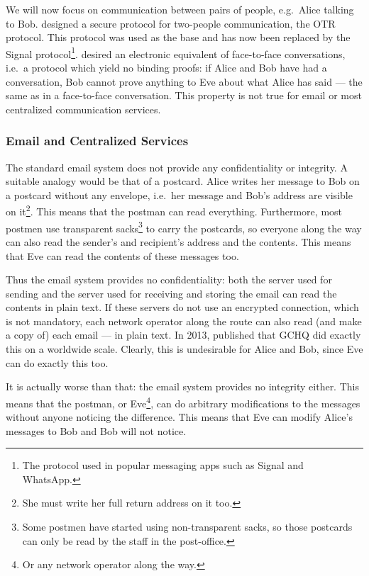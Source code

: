 We will now focus on communication between pairs of people, e.g.\ Alice talking 
to Bob.
\citeauthor{otr2004} designed a secure protocol for two-people communication, 
the \ac{OTR} protocol.
This protocol was used as the base and has now been replaced by the Signal 
protocol\footnote{%
  The protocol used in popular messaging apps such as Signal and WhatsApp.
}.
\citeauthor{otr2004} desired an electronic equivalent of face-to-face 
conversations, i.e.\ a protocol which yield no binding proofs:
if Alice and Bob have had a conversation, Bob cannot prove anything to Eve 
about what Alice has said --- the same as in a face-to-face conversation.
This property is not true for email or most centralized communication
services.

\subsubsection{Email and Centralized Services}

The standard email system does not provide any confidentiality or 
integrity.
A suitable analogy would be that of a postcard.
Alice writes her message to Bob on a postcard without any envelope, i.e.\ her 
message and Bob's address are visible on it\footnote{%
  She must write her full return address on it too.
}.
This means that the postman can read everything.
Furthermore, most postmen use transparent sacks\footnote{%
  Some postmen have started using non-transparent sacks, so those postcards can 
  only be read by the staff in the post-office.
} to carry the postcards, so everyone along the way can also read the sender's 
and recipient's address and the contents.
This means that Eve can read the contents of these messages too.

Thus the email system provides no confidentiality: both the server used for 
sending and the server used for receiving and storing the email can read the 
contents in plain text.
If these servers do not use an encrypted connection, which is not mandatory, 
each network operator along the route can also read (and make a copy of) each 
email --- in plain text.
In 2013, \textcite{Fibretap} published that \ac{GCHQ} did exactly this on 
a worldwide scale.
Clearly, this is undesirable for Alice and Bob, since Eve can do exactly this 
too.

It is actually worse than that: the email system provides no integrity either.
This means that the postman, or Eve\footnote{%
  Or any network operator along the way.
}, can do arbitrary modifications to the messages without anyone noticing the 
difference.
This means that Eve can modify Alice's messages to Bob and Bob will not notice.

